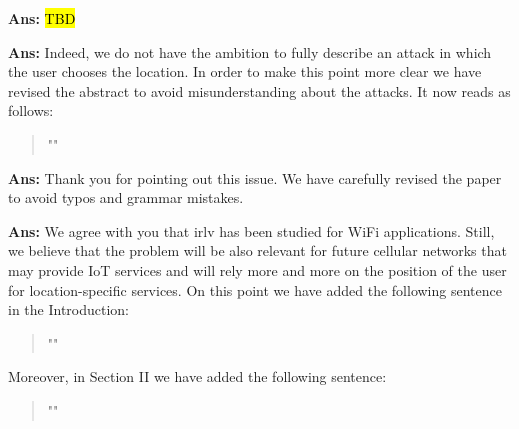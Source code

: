 \documentclass[draftcls,onecolumn,12pt]{IEEEtran}
\newcounter{revc}
\newcommand{\revp}[1]{\zref[revcontent]{#1}}
\begin{document}
\vspace{5mm} %
\begin{framed}
\end{framed}

{\bf Ans:} \hl{TBD}

\vspace{5mm} %
\begin{framed}
\end{framed}

{\bf Ans:} Indeed, we do not have the ambition to fully describe an attack in which the user chooses the location. In order to make this point more clear we have revised the abstract to avoid misunderstanding about the attacks. It now reads as follows:
\begin{quote}
    "\revp{rev14}"
\end{quote}

\vspace{5mm} %
\begin{framed}
\end{framed}

{\bf Ans:} Thank you for pointing out this issue. We have carefully revised the paper to avoid typos and grammar mistakes.

\vspace{5mm} %
\begin{framed}
\end{framed}

{\bf Ans:} We agree with you that \ac{irlv} has been studied for WiFi applications. Still, we believe that the problem will be also relevant for future cellular networks that may provide IoT services and will rely more and more on the position of the user for location-specific services. On this point we have added the following sentence in the Introduction:
\begin{quote}
    "\revp{WiFi}"
\end{quote}
Moreover, in Section II we have added the following sentence:
\begin{quote}
    "\revp{WiFi2}"
\end{quote}
\vspace{5mm} %
\begin{framed}
\end{framed}
\end{document}
